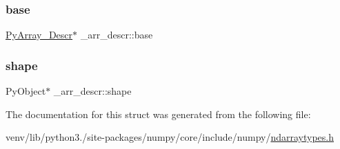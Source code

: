 \subsubsection{\texorpdfstring{base}{base}}
{\footnotesize\ttfamily \hyperlink{ndarraytypes_8h_a08fb2fb967ebbdd179e08d7b8756bd75}{Py\+Array\+\_\+\+Descr}$\ast$ \+\_\+arr\+\_\+descr\+::base}

\mbox{\label{struct__arr__descr_a21331efd549b036c2c1f4e00b74a6307}} 
\subsubsection{\texorpdfstring{shape}{shape}}
{\footnotesize\ttfamily Py\+Object$\ast$ \+\_\+arr\+\_\+descr\+::shape}



The documentation for this struct was generated from the following file\+:\begin{DoxyCompactItemize}
\item 
venv/lib/python3./site-\/packages/numpy/core/include/numpy/\hyperlink{ndarraytypes_8h}{ndarraytypes.\+h}\end{DoxyCompactItemize}
